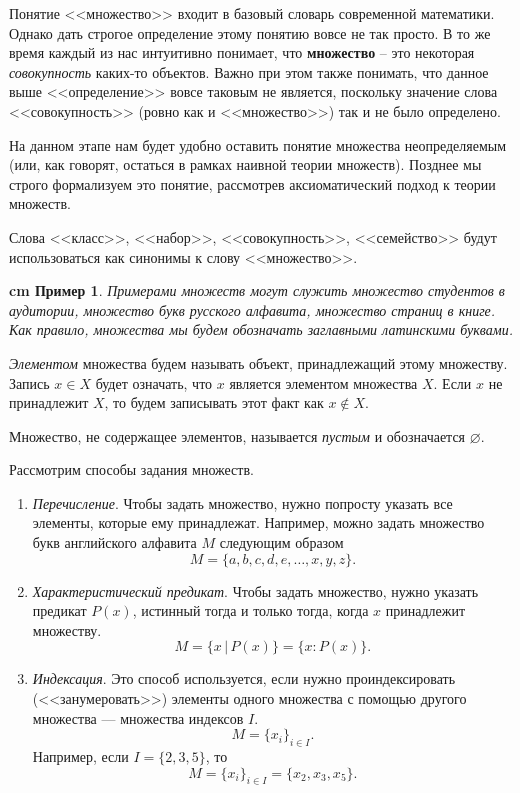 \documentclass[12pt, russian]{article}
\newtheorem{example}{\hskip 0.5 cm Пример}%
\begin{document}
Понятие <<множество>> входит в базовый словарь современной математики. Однако дать строгое определение этому понятию вовсе не так просто. В то же время каждый из нас интуитивно понимает, что \textbf{множество} -- это некоторая \textit{совокупность} каких-то объектов. Важно при этом также понимать, что данное выше <<определение>> вовсе таковым не является, поскольку значение слова <<совокупность>> (ровно как и <<множество>>) так и не было определено.

На данном этапе нам будет удобно оставить понятие множества неопределяемым (или, как говорят, остаться в рамках наивной теории множеств). Позднее мы строго формализуем это понятие, рассмотрев аксиоматический подход к теории множеств.

Слова <<класс>>, <<набор>>, <<совокупность>>, <<семейство>> будут использоваться как синонимы к слову <<множество>>.

\begin{example}
	Примерами множеств могут служить множество студентов в аудитории,  множество букв русского алфавита, множество страниц в книге. Как правило, множества мы будем обозначать заглавными латинскими буквами.
\end{example}

\textit{Элементом} множества будем называть объект, принадлежащий этому множеству. Запись $x \in X$ будет означать, что $x$ является элементом множества $X$. Если $x$ не принадлежит $X$, то будем записывать этот факт как $x \notin X$.

Множество, не содержащее элементов, называется \textit{пустым} и обозначается $\varnothing$.

Рассмотрим способы задания множеств.

\begin{enumerate}
	\item \textit{Перечисление}. Чтобы задать множество, нужно попросту указать все элементы, которые ему принадлежат. Например, можно задать множество букв английского алфавита $M$ следующим образом
	$$
	M = \{ a, b, c, d, e, \ldots, x, y, z \}.
	$$

	\item \textit{Характеристический предикат}. Чтобы задать множество, нужно указать предикат $P(x)$, истинный тогда и только тогда, когда $x$ принадлежит множеству.
	$$
	M = \{ x \, | \,  P(x)\} = \{ x: P(x)\}.
	$$

	\item \textit{Индексация}. Это способ используется, если нужно проиндексировать (<<занумеровать>>) элементы одного множества с помощью другого множества --- множества индексов $I$. 
	$$
	M = \{ x_i \}_{i \in I}.
	$$
	Например, если $I=\{2,3,5\}$, то
	$$
	M = \{ x_i \}_{i \in I} = \{ x_2, x_3, x_5 \}.
	$$
\end{enumerate}
\end{document}
